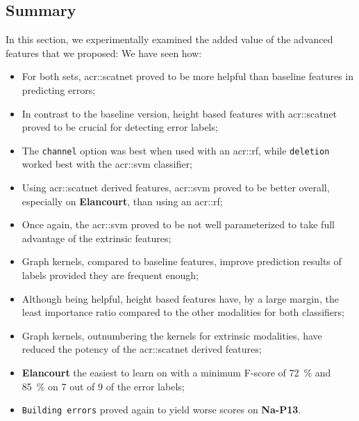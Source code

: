     \subsection{Summary}
        \label{subsec::advanced_experiments::better_features::summary}
        In this section, we experimentally examined the added value of the advanced features that we proposed:
        We have seen how:
        \begin{itemize}[label=\(\blacktriangleright\)]
            \item For both sets, \gls{acr::scatnet} proved to be more helpful than baseline features in predicting errors; 
            \item In contrast to the baseline version, height based features with \gls{acr::scatnet} proved to be crucial for detecting error labels;
            \item The \texttt{channel} option was best when used with an \gls{acr::rf}, while \texttt{deletion} worked best with the \gls{acr::svm} classifier;
            \item Using \gls{acr::scatnet} derived features, \gls{acr::svm} proved to be better overall, especially on \textbf{Elancourt}, than using an \gls{acr::rf};
            \item Once again, the \gls{acr::svm} proved to be not well parameterized to take full advantage of the extrinsic features;
            \item Graph kernels, compared to baseline features, improve prediction results of labels provided they are frequent enough;
            \item Although being helpful, height based features have, by a large margin, the least importance ratio compared to the other modalities for both classifiers;
            \item Graph kernels, outnumbering the kernels for extrinsic modalities, have reduced the potency of the \gls{acr::scatnet} derived features;
            \item \textbf{Elancourt} the easiest to learn on with a minimum F-score of \SI{72}{\percent} and \SI{85}{\percent} on 7 out of 9 of the error labels;
            \item \texttt{Building errors} proved again to yield worse scores on \textbf{Na-P13}.
        \end{itemize}


